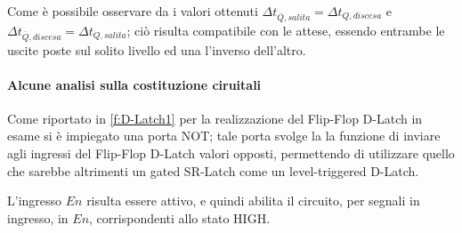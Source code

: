 	Come è possibile osservare da i valori ottenuti $\Delta t_{\overline{Q},salita} = \Delta t_{{Q},discesa}$ e $\Delta t_{\overline{Q},discesa} = \Delta t_{{Q},salita}$; ciò risulta compatibile con le attese, essendo entrambe le uscite poste sul solito livello ed una l'inverso dell'altro.
	\paragraph{Alcune analisi sulla costituzione ciruitali }
	Come riportato in \figurename{ \ref{f:D-Latch1}} per la realizzazione del Flip-Flop D-Latch in esame si è impiegato una porta NOT;
	tale porta svolge la la funzione di inviare agli ingressi del Flip-Flop D-Latch valori opposti, permettendo di utilizzare quello che sarebbe altrimenti un gated SR-Latch come un level-triggered D-Latch.

	L'ingresso $En$ risulta essere attivo, e quindi abilita il circuito, per
	segnali in ingresso, in $En$, corrispondenti allo stato HIGH.
